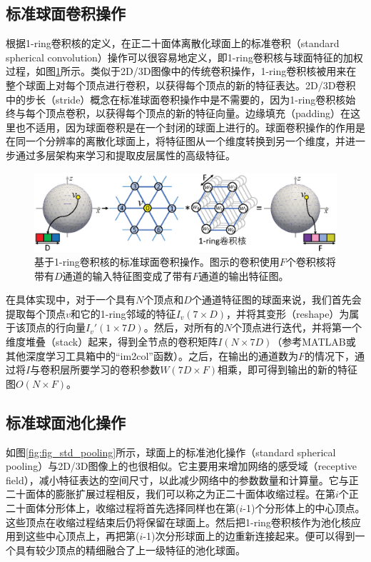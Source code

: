 \subsection{标准球面卷积操作}
根据1-ring卷积核的定义，在正二十面体离散化球面上的标准卷积（standard spherical convolution）操作可以很容易地定义，即1-ring卷积核与球面特征的加权过程，如图\ref{fig:fig_std_conv}所示。类似于2D/3D图像中的传统卷积操作，1-ring卷积核被用来在整个球面上对每个顶点进行卷积，以获得每个顶点的新的特征表达。2D/3D卷积中的步长（stride）概念在标准球面卷积操作中是不需要的，因为1-ring卷积核始终与每个顶点卷积，以获得每个顶点的新的特征向量。边缘填充（padding）在这里也不适用，因为球面卷积是在一个封闭的球面上进行的。球面卷积操作的作用是在同一个分辨率的离散化球面上，将特征图从一个维度转换到另一个维度，并进一步通过多层架构来学习和提取皮层属性的高级特征。

\begin{figure}[h]
	\centering
	\includegraphics[width=\linewidth]{figure/figure_convolution.eps}
	\caption{基于1-ring卷积核的标准球面卷积操作。图示的卷积使用$F$个卷积核将带有$D$通道的输入特征图变成了带有$F$通道的输出特征图。}
	\label{fig:fig_std_conv}
\end{figure}

在具体实现中，对于一个具有$N$个顶点和$D$个通道特征图的球面来说，我们首先会提取每个顶点$v$和它的1-ring邻域的特征$I_v(7\times D)$，并将其变形（reshape）为属于该顶点的行向量$I_v'(1\times 7D)$。然后，对所有的$N$个顶点进行迭代，并将第一个维度堆叠（stack）起来，得到全节点的卷积矩阵$I(N\times 7D)$（参考MATLAB或其他深度学习工具箱中的“im2col”函数）。之后，在输出的通道数为$F$的情况下，通过将$I$与卷积层所要学习的卷积参数$W(7D\times F)$相乘，即可得到输出的新的特征图$O(N\times F)$。


\subsection{标准球面池化操作}
如图\ref{fig:fig_std_pooling}所示，球面上的标准池化操作（standard spherical pooling）与2D/3D图像上的也很相似。它主要用来增加网络的感受域（receptive field），减小特征表达的空间尺寸，以此减少网络中的参数数量和计算量。它与正二十面体的膨胀扩展过程相反，我们可以称之为正二十面体收缩过程。在第$i$个正二十面体分形体上，收缩过程将首先选择同样也在第($i$-1)个分形体上的中心顶点。这些顶点在收缩过程结束后仍将保留在球面上。然后把1-ring卷积核作为池化核应用到这些中心顶点上，再把第($i$-1)次分形球面上的边重新连接起来。便可以得到一个具有较少顶点的精细融合了上一级特征的池化球面。

